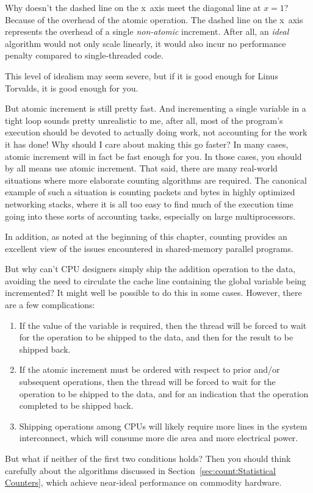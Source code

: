 \QuickQ{}
	Why doesn't the dashed line on the x~axis meet the 
	diagonal line at $x=1$?
\QuickA{}
	Because of the overhead of the atomic operation.
	The dashed line on the x~axis represents the overhead of
	a single \emph{non-atomic} increment.
	After all, an \emph{ideal} algorithm would not only scale
	linearly, it would also incur no performance penalty compared
	to single-threaded code.

	This level of idealism may seem severe, but if it is good
	enough for Linus Torvalds, it is good enough for you.

\QuickQ{}
	But atomic increment is still pretty fast.
	And incrementing a single variable in a tight loop sounds
	pretty unrealistic to me, after all, most of the program's
	execution should be devoted to actually doing work, not accounting
	for the work it has done!
	Why should I care about making this go faster?
\QuickA{}
	In many cases, atomic increment will in fact be fast enough
	for you.
	In those cases, you should by all means use atomic increment.
	That said, there are many real-world situations where
	more elaborate counting algorithms are required.
	The canonical example of such a situation is counting packets
	and bytes in highly optimized networking stacks, where it is
	all too easy to find much of the execution time going into
	these sorts of accounting tasks, especially on large
	multiprocessors.

	In addition, as noted at the beginning of this chapter,
	counting provides an excellent view of the
	issues encountered in shared-memory parallel programs.

\QuickQ{}
	But why can't CPU designers simply ship the addition operation to the
	data, avoiding the need to circulate the cache line containing
	the global variable being incremented?
\QuickA{}
	It might well be possible to do this in some cases.
	However, there are a few complications:
	\begin{enumerate}
	\item	If the value of the variable is required, then the
		thread will be forced to wait for the operation
		to be shipped to the data, and then for the result
		to be shipped back.
	\item	If the atomic increment must be ordered with respect
		to prior and/or subsequent operations, then the thread
		will be forced to wait for the operation to be shipped
		to the data, and for an indication that the operation
		completed to be shipped back.
	\item	Shipping operations among CPUs will likely require
		more lines in the system interconnect, which will consume
		more die area and more electrical power.
	\end{enumerate}
	But what if neither of the first two conditions holds?
	Then you should think carefully about the algorithms discussed
	in Section~\ref{sec:count:Statistical Counters}, which achieve
	near-ideal performance on commodity hardware.

